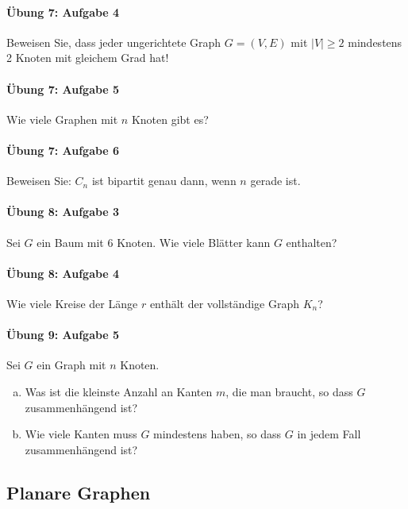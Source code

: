 \documentclass
[
  draft    = true,
  fontsize = 11pt,
  parskip  = half-,
  BCOR     = 0pt,
  DIV      = 11,
  ngerman,
  dvipsnames
]
{scrartcl}
\begin{document}
\paragraph{Übung 7: Aufgabe 4}
Beweisen Sie, dass jeder ungerichtete Graph $G=(V,E)$ mit $|V|\geq2$
mindestens 2 Knoten mit gleichem Grad hat!

\paragraph{Übung 7: Aufgabe 5}
Wie viele Graphen mit $n$ Knoten gibt es?

\paragraph{Übung 7: Aufgabe 6}
Beweisen Sie: $C_n$ ist bipartit genau dann, wenn $n$ gerade ist.

\paragraph{Übung 8: Aufgabe 3}
Sei $G$ ein Baum mit 6 Knoten. Wie viele Blätter kann $G$ enthalten?

\paragraph{Übung 8: Aufgabe 4}
Wie viele Kreise der Länge $r$ enthält der vollständige Graph $K_n$?

\paragraph{Übung 9: Aufgabe 5}
Sei $G$ ein Graph mit $n$ Knoten.
\begin{enumerate}[a)]
  \item Was ist die kleinste Anzahl an Kanten $m$, die man braucht, so dass $G$ zusammenhängend ist?
  \item Wie viele Kanten muss $G$ mindestens haben, so dass $G$ in jedem Fall zusammenhängend ist?
\end{enumerate}

\subsection{Planare Graphen}
\end{document}
